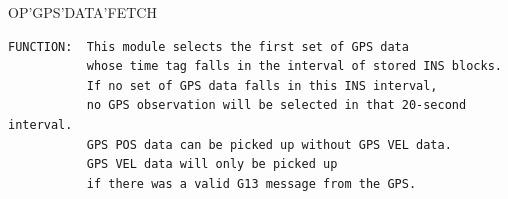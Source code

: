 \begin{frame}
OP'GPS'DATA'FETCH
\begin{verbatim}
FUNCTION:  This module selects the first set of GPS data 
           whose time tag falls in the interval of stored INS blocks.  
           If no set of GPS data falls in this INS interval, 
           no GPS observation will be selected in that 20-second interval.  
           GPS POS data can be picked up without GPS VEL data.   
           GPS VEL data will only be picked up 
           if there was a valid G13 message from the GPS.  
\end{verbatim}
\end{frame}
